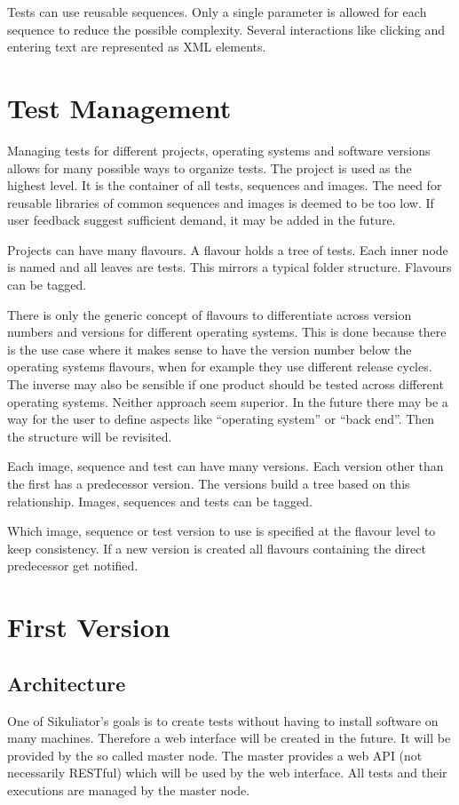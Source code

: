 \documentclass[a4paper,twocolumn,twoside]{article}
\newcommand{\Sik}[0]{Sikuliator}
\begin{document}
Tests can use reusable sequences.
Only a single parameter is allowed for each sequence to reduce the possible complexity.
Several interactions like clicking and entering text are represented as XML elements.

\section{Test Management}
Managing tests for different projects, operating systems and software versions allows for many possible ways to organize tests.
The project is used as the highest level.
It is the container of all tests, sequences and images.
The need for reusable libraries of common sequences and images is deemed to be too low.
If user feedback suggest sufficient demand, it may be added in the future.

Projects can have many flavours.
A flavour holds a tree of tests.
Each inner node is named and all leaves are tests.
This mirrors a typical folder structure.
Flavours can be tagged.

There is only the generic concept of flavours to differentiate across version numbers and versions for different operating systems.
This is done because there is the use case where it makes sense to have the version number below the operating systems flavours, when for example they use different release cycles.
The inverse may also be sensible if one product should be tested across different operating systems.
Neither approach seem superior.
In the future there may be a way for the user to define aspects like \enquote{operating system} or \enquote{back end}. Then the structure will be revisited.

Each image, sequence and test can have many versions.
Each version other than the first has a predecessor version.
The versions build a tree based on this relationship.
Images, sequences and tests can be tagged.

Which image, sequence or test version to use is specified at the flavour level to keep consistency.
If a new version is created all flavours containing the direct predecessor get notified.

\section{First Version}
\subsection{Architecture}
One of \Sik{}'s goals is to create tests without having to install software on many machines.
Therefore a web interface will be created in the future.
It will be provided by the so called master node.
The master provides a web API (not necessarily RESTful) which will be used by the web interface.
All tests and their executions are managed by the master node.
\end{document}

